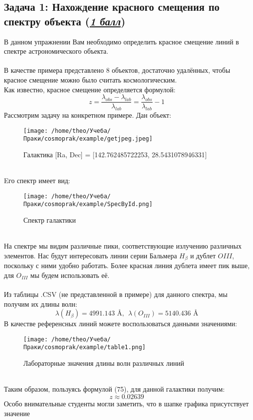 \documentclass{article}
\newcommand{\ttt}[1]{\underline{\textit{#1}}}
\newcommand{\eq}[1]{\begin{equation} #1 \end{equation}}
\begin{document}
\subsection*{Задача 1: Нахождение красного смещения по спектру объекта (\ttt{1 балл})}
В данном упражнении Вам необходимо определить красное смещение линий в спектре астрономического
объекта. \\\\
В качестве примера представлено 8 объектов, достаточно удалённых, чтобы красное смещение можно 
было считать космологическим. \\ Как известно, красное смещение определяется формулой: 
\eq{z = \frac{\lambda_{obs}-\lambda_{lab}}{\lambda_{lab}} = \frac{\lambda_{obs}}{\lambda_{lab}}-1}
Рассмотрим задачу на конкретном примере. Дан объект:
\begin{figure}[h!]
  \centering
  \texttt{[image: /home/theo/Учеба/Праки/cosmoprak/example/getjpeg.jpeg]}
  \caption{Галактика [Ra, Dec] = [142.762485722253, 28.5431078946331]}
  \label{fig:имя_фигуры}
\end{figure} \\Eго спектр имеет вид:
\begin{figure}[h!]
  \centering
  \texttt{[image: /home/theo/Учеба/Праки/cosmoprak/example/SpecById.png]}
  \caption{Спектр галактики}
  \label{fig:имя_фигуры}
\end{figure}
\\На спектре мы видим различные пики, соответствующие излучению различных элементов. Нас будут 
интересовать линии серии Бальмера $H_\beta$ и дублет $OIII$, поскольку с ними удобно работать. Более
красная линия дублета имеет пик выше, для $O_{III}$ мы будем использовать её. \\\\   
Из таблицы .CSV (не представленной в примере) для данного спектра, мы получим их длины волн:
$$\lambda(H_\beta) = 4991.143 \text{ Å,  }\; \lambda(O_{III})= 5140.436 \text{ Å}$$
В качестве референсных линий можете воспользоваться данными значениями:
\begin{figure}[h!]
  \centering
  \texttt{[image: /home/theo/Учеба/Праки/cosmoprak/example/table1.png]}
  \caption{Лабораторные значения длины волн различных линий}
  \label{fig:имя_фигуры}
\end{figure}\\
Таким образом, пользуясь формулой (75), для данной галактики получим:
$$z \approx 0.02639 $$
Особо внимательные студенты могли заметить, что в шапке графика присутствует значение
\end{document}

